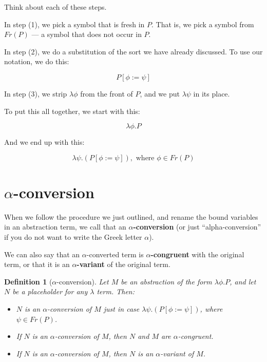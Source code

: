 \documentclass{book}
\numberwithin{equation}{chapter}
\newcommand{\vocab}{\textbf}
\newtheorem{definition}{Definition}
\begin{document}
\noindent
Think about each of these steps. 

In step (1), we pick a symbol that is fresh in $P$. That is, we pick a symbol from $Fr(P)$ --- a symbol that does not occur in $P$.

In step (2), we do a substitution of the sort we have already discussed. To use our notation, we do this:

\begin{equation}
P[\phi := \psi]
\end{equation}

\noindent
In step (3), we strip $\lambda \phi$ from the front of $P$, and we put $\lambda \psi$ in its place.

To put this all together, we start with this:

\begin{equation}
\lambda \phi.P
\end{equation}

\noindent
And we end up with this:

\begin{equation}
\lambda \psi.(P[\phi := \psi]), \text{ where } \phi \in Fr(P)
\end{equation}


\section{$\alpha$-conversion}

When we follow the procedure we just outlined, and rename the bound variables in an abstraction term, we call that an \vocab{$\alpha$-conversion} (or just ``alpha-conversion'' if you do not want to write the Greek letter $\alpha$). 

We can also say that an $\alpha$-converted term is \vocab{$\alpha$-congruent} with the original term, or that it is an \vocab{$\alpha$-variant} of the original term.

\begin{definition}[$\alpha$-conversion]
Let $M$ be an abstraction of the form $\lambda \phi.P$, and let $N$ be a placeholder for any $\lambda$ term. Then:

\begin{itemize}
\item{$N$ is an $\alpha$-conversion of $M$ just in case $\lambda \psi.(P[\phi := \psi])$, where $\psi \in Fr(P)$.} 
\item{If $N$ is an $\alpha$-conversion of $M$, then $N$ and $M$ are $\alpha$-congruent.}
\item{If $N$ is an $\alpha$-conversion of $M$, then $N$ is an $\alpha$-variant of $M$.}
\end{itemize}
\end{definition}
\end{document}
